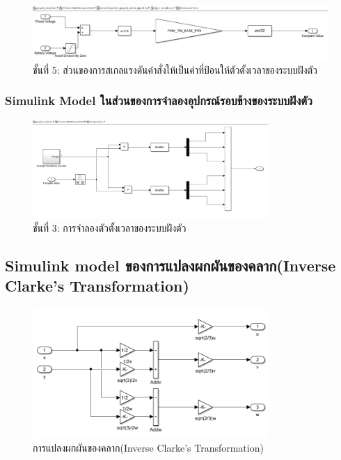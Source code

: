 \documentclass[11pt,a4paper]{article}
\begin{document}
\begin{figure}[H]
    \centering
    \includegraphics[width=\textwidth]{l5-to-cmp.png}
    \caption{ชั้นที่ 5: ส่วนของการสเกลแรงดันคำสั่งให้เป็นค่าที่ป้อนให้ตัวตั้งเวลาของระบบฝังตัว}
\end{figure}

\subsubsection{Simulink Model ในส่วนของการจำลองอุปกรณ์รอบข้างของระบบฝังตัว}

\begin{figure}[H]
    \centering
    \includegraphics[width=0.8\textwidth]{l3-sim-tim.png}
    \caption{ชั้นที่ 3: การจำลองตัวตั้งเวลาของระบบฝังตัว}
\end{figure}

\subsection{Simulink model ของการแปลงผกผันของคลาก(Inverse Clarke's Transformation)}
\begin{figure}[H]
    \centering
    \includegraphics[width=0.8\textwidth]{inverse_clarke.png}
    \caption{การแปลงผกผันของคลาก(Inverse Clarke's Transformation)}
\end{figure}


\end{document}

